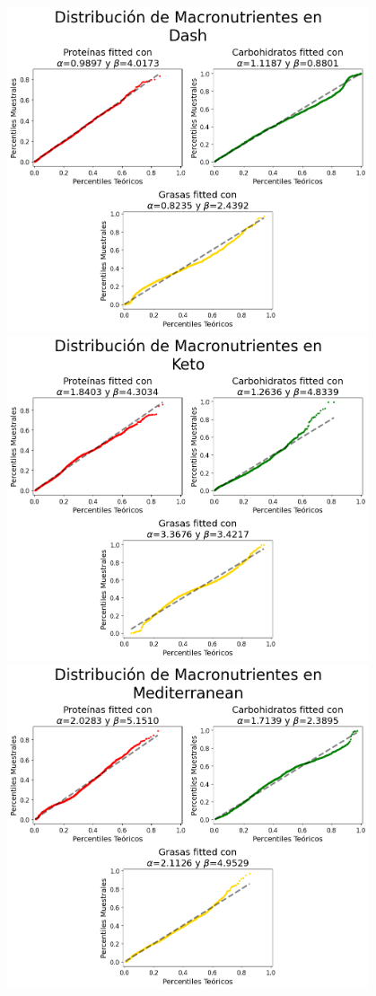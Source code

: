 \documentclass[12pt,a4paper]{article}
\begin{document}
        \begin{center}
            \includegraphics[width=0.8\textwidth]{Resources/5_05_plot_1.png}
            \includegraphics[width=0.8\textwidth]{Resources/5_05_plot_2.png}
            \includegraphics[width=0.8\textwidth]{Resources/5_05_plot_3.png}

\end{center}
\end{document}
